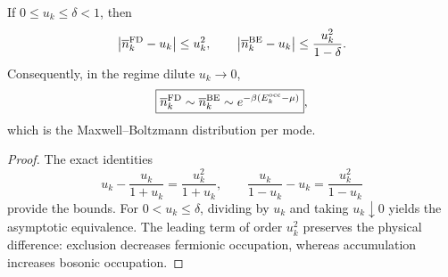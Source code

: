 \begin{theorem}
\label{thm:limite-clasico-fd-be-rev2}
If \(0\leq u_k\leq\delta<1\), then
\[
 \left|\overline n_k^{\rm FD}-u_k\right|\leq u_k^2,
 \qquad
 \left|\overline n_k^{\rm BE}-u_k\right|
 \leq\frac{u_k^2}{1-\delta}.
\]
Consequently, in the regime dilute \(u_k\to0\),
\[
 \boxed{
 \overline n_k^{\rm FD}\sim
 \overline n_k^{\rm BE}\sim
 e^{-\beta(E_k^{\rm occ}-\mu)}} ,
\]
which is the Maxwell--Boltzmann distribution per mode.
\end{theorem}

\begin{proof}
The exact identities
\[
 u_k-\frac{u_k}{1+u_k}=\frac{u_k^2}{1+u_k},
 \qquad
 \frac{u_k}{1-u_k}-u_k=\frac{u_k^2}{1-u_k}
\]
provide the bounds. For \(0<u_k\leq\delta\), dividing by \(u_k\) and
taking \(u_k\downarrow0\) yields
the asymptotic equivalence. The leading term of order \(u_k^2\) preserves the
physical difference: exclusion decreases fermionic occupation, whereas
accumulation increases bosonic occupation.
\end{proof}
